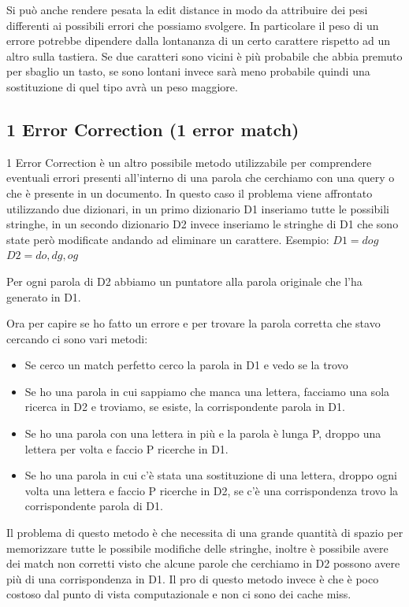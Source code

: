 \documentclass[14pt]{extreport}
\begin{document}
Si può anche rendere pesata la edit distance in modo da attribuire dei pesi differenti ai possibili errori che possiamo svolgere. In particolare il peso di un errore potrebbe dipendere dalla lontananza di un certo carattere rispetto ad un altro sulla tastiera. Se due caratteri sono vicini è più probabile che abbia premuto per sbaglio un tasto, se sono lontani invece sarà meno probabile quindi una sostituzione di quel tipo avrà un peso maggiore.

\subsection{1 Error Correction (1 error match)}

1 Error Correction è un altro possibile metodo utilizzabile per comprendere eventuali errori presenti all'interno di una parola che cerchiamo con una query o che è presente in un documento.
In questo caso il problema viene affrontato utilizzando due dizionari, in un primo dizionario D1 inseriamo tutte le possibili stringhe, in un secondo dizionario D2 invece inseriamo le stringhe di D1 che sono state però modificate andando ad eliminare un carattere.
Esempio:
\newline
$D1 = {dog}$
\newline
$D2 = {do, dg, og}$
\newline

Per ogni parola di D2 abbiamo un puntatore alla parola originale che l'ha generato in D1.

Ora per capire se ho fatto un errore e per trovare la parola corretta che stavo cercando ci sono vari metodi:
\begin{itemize}
    \item Se cerco un match perfetto cerco la parola in D1 e vedo se la trovo
    \item Se ho una parola in cui sappiamo che manca una lettera, facciamo una sola ricerca in D2 e troviamo, se esiste, la corrispondente parola in D1.
    \item Se ho una parola con una lettera in più e la parola è lunga P, droppo una lettera per volta e faccio P ricerche in D1.
    \item Se ho una parola in cui c'è stata una sostituzione di una lettera, droppo ogni volta una lettera e faccio P ricerche in D2, se c'è una corrispondenza trovo la corrispondente parola di D1.
\end{itemize}

Il problema di questo metodo è che necessita di una grande quantità di spazio per memorizzare tutte le possibile modifiche delle stringhe, inoltre è possibile avere dei match non corretti visto che alcune parole che cerchiamo in D2 possono avere più di una corrispondenza in D1.
Il pro di questo metodo invece è che è poco costoso dal punto di vista computazionale e non ci sono dei cache miss.
\end{document}
